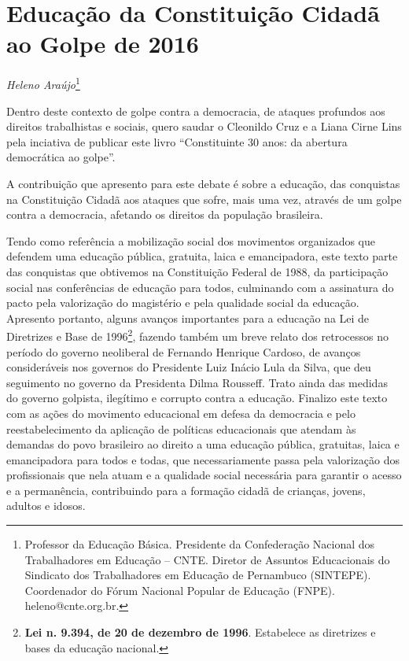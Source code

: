 \chapter{Educação da Constituição Cidadã ao Golpe de 2016}

\begin{flushright}
\emph{Heleno Araújo}\footnote{Professor da Educação Básica. Presidente da
  Confederação Nacional dos Trabalhadores em Educação -- CNTE. Diretor
  de Assuntos Educacionais do Sindicato dos Trabalhadores em Educação de
  Pernambuco (SINTEPE). Coordenador do Fórum Nacional Popular de
  Educação (FNPE). heleno@cnte.org.br.}
\end{flushright}

Dentro deste contexto de golpe contra a democracia, de ataques profundos
aos direitos trabalhistas e sociais, quero saudar o Cleonildo Cruz e a
Liana Cirne Lins pela inciativa de publicar este livro ``Constituinte 30
anos: da abertura democrática ao golpe''.

A contribuição que apresento para este debate é sobre a educação, das
conquistas na Constituição Cidadã aos ataques que sofre, mais uma vez,
através de um golpe contra a democracia, afetando os direitos da
população brasileira.

Tendo como referência a mobilização social dos movimentos organizados
que defendem uma educação pública, gratuita, laica e emancipadora, este
texto parte das conquistas que obtivemos na Constituição Federal de
1988, da participação social nas conferências de educação para todos,
culminando com a assinatura do pacto pela valorização do magistério e
pela qualidade social da educação. Apresento portanto, alguns avanços
importantes para a educação na Lei de Diretrizes e Base de
1996\footnote{\textbf{Lei n. 9.394, de 20 de dezembro de 1996}.
  Estabelece as diretrizes e bases da educação nacional.}, fazendo
também um breve relato dos retrocessos no período do governo neoliberal
de Fernando Henrique Cardoso, de avanços consideráveis nos governos do
Presidente Luiz Inácio Lula da Silva, que deu seguimento no governo da
Presidenta Dilma Rousseff. Trato ainda das medidas do governo golpista,
ilegítimo e corrupto contra a educação. Finalizo este texto com as ações
do movimento educacional em defesa da democracia e pelo
reestabelecimento da aplicação de políticas educacionais que atendam às
demandas do povo brasileiro ao direito a uma educação pública,
gratuitas, laica e emancipadora para todos e todas, que necessariamente
passa pela valorização dos profissionais que nela atuam e a qualidade
social necessária para garantir o acesso e a permanência, contribuindo
para a formação cidadã de crianças, jovens, adultos e idosos.

